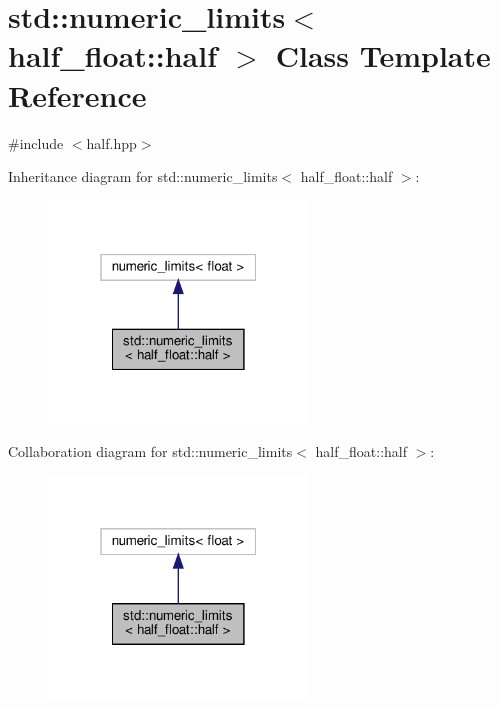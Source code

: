 \hypertarget{classstd_1_1numeric__limits_3_01half__float_1_1half_01_4}{}\section{std\+:\+:numeric\+\_\+limits$<$ half\+\_\+float\+:\+:half $>$ Class Template Reference}
\label{classstd_1_1numeric__limits_3_01half__float_1_1half_01_4}


{\ttfamily \#include $<$half.\+hpp$>$}



Inheritance diagram for std\+:\+:numeric\+\_\+limits$<$ half\+\_\+float\+:\+:half $>$\+:
\nopagebreak
\begin{figure}[H]
\begin{center}
\leavevmode
\includegraphics[width=196pt]{classstd_1_1numeric__limits_3_01half__float_1_1half_01_4__inherit__graph}
\end{center}
\end{figure}


Collaboration diagram for std\+:\+:numeric\+\_\+limits$<$ half\+\_\+float\+:\+:half $>$\+:
\nopagebreak
\begin{figure}[H]
\begin{center}
\leavevmode
\includegraphics[width=196pt]{classstd_1_1numeric__limits_3_01half__float_1_1half_01_4__coll__graph}
\end{center}
\end{figure}
